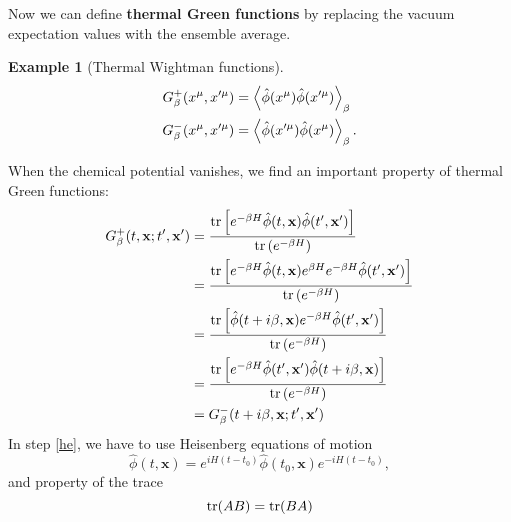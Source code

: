 \documentclass[12pt]{article}
\numberwithin{equation}{section}
\theoremstyle{1style}
\newtheorem{example}[equation]{Example}
\newcommand{\tbf}[1]{\textbf{#1}}
\begin{document}
Now we can define \tbf{thermal Green functions} by replacing the vacuum expectation values with the ensemble average.

\begin{example}[Thermal Wightman functions]
  \begin{align*}
    G^{+}_{\beta}(x^{\mu},x'^{\mu}) & =\expval{\hat{\phi}(x^{\mu})\hat{\phi}(x'^{\mu})}_{\beta}  \\
    G^{-}_{\beta}(x^{\mu},x'^{\mu}) & =\expval{\hat{\phi}(x'^{\mu})\hat{\phi}(x^{\mu})}_{\beta}.
  \end{align*}
\end{example}

When the chemical potential vanishes, we find an important property of thermal Green functions:
\begin{align}
  G^{+}_{\beta}(t,\mathbf{x};t',\mathbf{x'}) & =\frac{\tr\left[e^{-\beta H}\hat{\phi}(t,\mathbf{x})\hat{\phi}(t',\mathbf{x'})\right]}
  {\tr\left(e^{-\beta H}\right)}                                                                                                                             \\
                                             & =\frac{\tr\left[e^{-\beta H}\hat{\phi}(t,\mathbf{x})e^{\beta H}e^{-\beta H}\hat{\phi}(t',\mathbf{x'})\right]}
  {\tr\left(e^{-\beta H}\right)}                                                                                                                             \\
                                             & =\frac{\tr\left[\hat{\phi}(t+i\beta,\mathbf{x})e^{-\beta H}\hat{\phi}(t',\mathbf{x'})\right]}
  {\tr\left(e^{-\beta H}\right)}\label{he}                                                                                                                   \\
                                             & =\frac{\tr\left[e^{-\beta H}\hat{\phi}(t',\mathbf{x'})\hat{\phi}(t+i\beta,\mathbf{x})\right]}
  {\tr\left(e^{-\beta H}\right)}                                                                                                                             \\
                                             & =G^{-}_{\beta}(t+i\beta,\mathbf{x};t',\mathbf{x'})
\end{align}
In step \ref{he}, we have to use Heisenberg equations of motion
\begin{equation}
  \hat{\phi}(t,\mathbf{x})=e^{iH(t-t_0)}\hat{\phi}(t_0,\mathbf{x})e^{-i H(t-t_0)},
\end{equation}
and property of the trace
\begin{equation}
  \tr(AB)=\tr(BA)
\end{equation}
\end{document}
